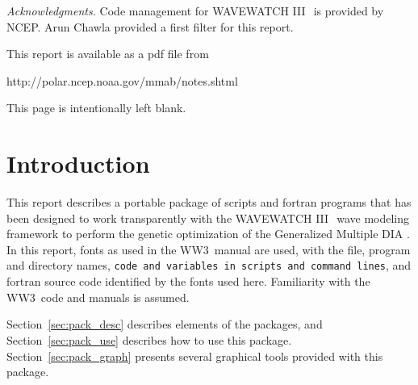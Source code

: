 \documentclass[12pt]{article}
\newcommand{\pstyle}{myheadings}
\newcommand{\wwt}{WAVEWATCH III$\:$\textsuperscript\textregistered}
\newcommand{\ws}{WW3}
\newcommand{\gmd}{GMD}
\newcommand{\file}{\sf}
\newcommand{\code}{\tt}
\newcommand{\F}{\sc}
\newcommand{\pb}{\strut \vfill \pagebreak}
\newcommand{\bpagea}{\strut

\vspace{2.5in} \centerline{This page is intentionally left blank.}}
\newcommand{\newsec}{\setcounter{equation}{0}
                      \setcounter{myfigno}{0}
                      \setcounter{mytabno}{0}}
\newcounter{myfigno}[section]
\newcounter{mytabno}[section]
\begin{document}


{\it Acknowledgments.} Code management for \wwt\ is provided by NCEP. Arun
Chawla provided a first filter for this report.

\vspace{\baselineskip} \noindent
This report is available as a pdf file from

\vspace{\baselineskip}
\centerline{http://polar.ncep.noaa.gov/mmab/notes.shtml}


\vfill \pagebreak

\tableofcontents

\pb
\pagestyle{empty}

\bpagea


\pb
\pagestyle{\pstyle}
\section{Introduction} \label{sec:intro}
\newsec

\noindent
This report describes a portable package of scripts and {\F fortran} programs
that has been designed to work transparently with the \wwt\ wave modeling
framework \citep[model henceforth denoted as \ws]{tol:MMAB09a} to perform the
genetic optimization \citep[e.g.,][]{bk:ES03} of the Generalized Multiple DIA
\citep[\gmd,][]{tol:MMAB10d, tol:OMODgmd1, tol:OMODgmd2}.  In this report,
fonts as used in the \ws\ manual are used, with the {\file file, program and
directory names}, {\code code and variables in scripts and command lines}, and
{\F fortran} source code identified by the fonts used here. Familiarity with
the \ws\ code and manuals is assumed.

Section~\ref{sec:pack_desc} describes elements of the packages, and
Section~\ref{sec:pack_use} describes how to use this package.
Section~\ref{sec:pack_graph} presents several graphical tools provided with
this package.
\end{document}
